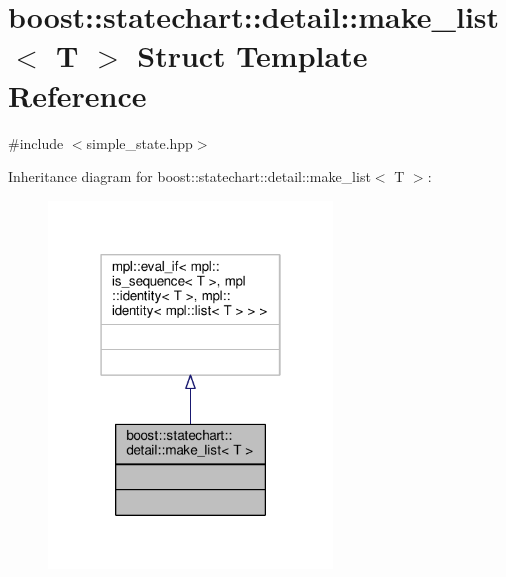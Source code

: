 \hypertarget{structboost_1_1statechart_1_1detail_1_1make__list}{}\section{boost\+:\+:statechart\+:\+:detail\+:\+:make\+\_\+list$<$ T $>$ Struct Template Reference}
\label{structboost_1_1statechart_1_1detail_1_1make__list}


{\ttfamily \#include $<$simple\+\_\+state.\+hpp$>$}



Inheritance diagram for boost\+:\+:statechart\+:\+:detail\+:\+:make\+\_\+list$<$ T $>$\+:
\nopagebreak
\begin{figure}[H]
\begin{center}
\leavevmode
\includegraphics[width=214pt]{structboost_1_1statechart_1_1detail_1_1make__list__inherit__graph}
\end{center}
\end{figure}


